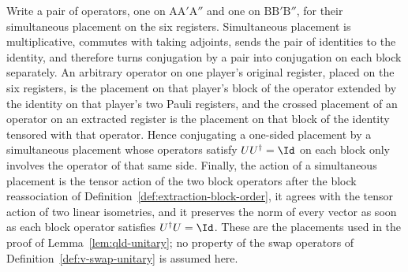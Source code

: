 \begin{lemma}\label{lem:extraction-block-placement-support}
	\leanok
	Write a pair of operators, one on $\mathrm{A}\mathrm{A}'\mathrm{A}''$ and one on $\mathrm{B}\mathrm{B}'\mathrm{B}''$, for their simultaneous placement on the six registers.  Simultaneous placement is multiplicative, commutes with taking adjoints, sends the pair of identities to the identity, and therefore turns conjugation by a pair into conjugation on each block separately.  An arbitrary operator on one player's original register, placed on the six registers, is the placement on that player's block of the operator extended by the identity on that player's two Pauli registers, and the crossed placement of an operator on an extracted register is the placement on that block of the identity tensored with that operator.  Hence conjugating a one-sided placement by a simultaneous placement whose operators satisfy $UU^\dagger = \Id$ on each block only involves the operator of that same side.  Finally, the action of a simultaneous placement is the tensor action of the two block operators after the block reassociation of Definition~\ref{def:extraction-block-order}, it agrees with the tensor action of two linear isometries, and it preserves the norm of every vector as soon as each block operator satisfies $U^\dagger U = \Id$.  These are the placements used in the proof of Lemma~\ref{lem:qld-unitary}; no property of the swap operators of Definition~\ref{def:v-swap-unitary} is assumed here.
\end{lemma}
